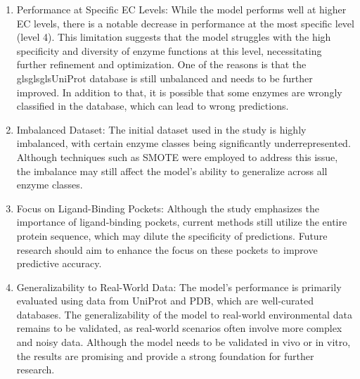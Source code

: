 \begin{enumerate}
    \item Performance at Specific EC Levels: While the model performs well at higher EC levels, there is a notable decrease in performance at the most specific level (level 4). This limitation suggests that the model struggles with the high specificity and diversity of enzyme functions at this level, necessitating further refinement and optimization. One of the reasons is that the gls{gls{gls{UniProt}}} database is still unbalanced and needs to be further improved. In addition to that, it is possible that some enzymes are wrongly classified in the database, which can lead to wrong predictions.
    \item Imbalanced Dataset: The initial dataset used in the study is highly imbalanced, with certain enzyme classes being significantly underrepresented. Although techniques such as SMOTE were employed to address this issue, the imbalance may still affect the model's ability to generalize across all enzyme classes.
    \item Focus on Ligand-Binding Pockets: Although the study emphasizes the importance of ligand-binding pockets, current methods still utilize the entire protein sequence, which may dilute the specificity of predictions. Future research should aim to enhance the focus on these pockets to improve predictive accuracy.
    \item Generalizability to Real-World Data: The model's performance is primarily evaluated using data from UniProt and PDB, which are well-curated databases. The generalizability of the model to real-world environmental data remains to be validated, as real-world scenarios often involve more complex and noisy data. Although the model needs to be validated in vivo or in vitro, the results are promising and provide a strong foundation for further research.
\end{enumerate}